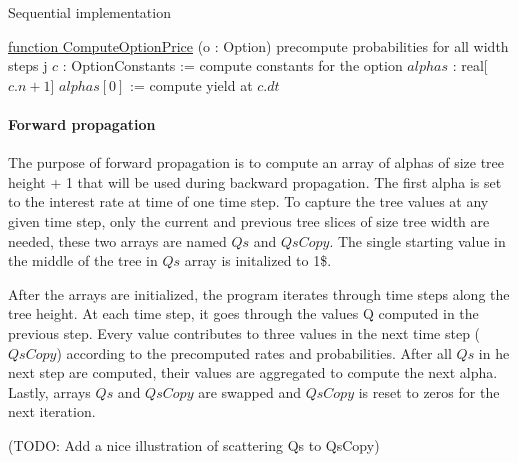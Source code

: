 \begin{algorithm}[H]
    \DontPrintSemicolon
    \caption{Sequential implementation\label{alg:sequential}}

    \underline{function ComputeOptionPrice} (o : Option)\;
    \;
    precompute probabilities for all width steps j\;
    $c$ : OptionConstants := compute constants for the option\;
    \;
    $alphas$ : real[$c.n + 1$]\;
    $alphas[0]$ := compute yield at $c.dt$ 
\end{algorithm}

\paragraph{Forward propagation}
The purpose of forward propagation is to compute an array of alphas of size tree height + 1 that will be used during backward propagation. The first alpha is set to the interest rate at time of one time step. To capture the tree values at any given time step, only the current and previous tree slices of size tree width are needed, these two arrays are named $Qs$ and $QsCopy$. The single starting value in the middle of the tree in $Qs$ array is initalized to 1\$.

After the arrays are initialized, the program iterates through time steps along the tree height. At each time step, it goes through the values Q computed in the previous step. Every value contributes to three values in the next time step ($QsCopy$) according to the precomputed rates and probabilities. After all $Qs$ in he next step are computed, their values are aggregated to compute the next alpha. Lastly, arrays $Qs$ and $QsCopy$ are swapped and $QsCopy$ is reset to zeros for the next iteration.

(TODO: Add a nice illustration of scattering Qs to QsCopy)

